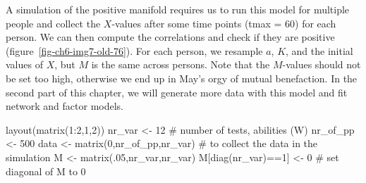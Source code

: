 \documentclass[
  a4paper,
  DIV=11,
  numbers=noendperiod,
  oneside]{scrreprt}
\newenvironment{Shaded}{}{}
\newcommand{\CommentTok}[1]{\textcolor[rgb]{0.42,0.45,0.49}{#1}}
\newcommand{\DecValTok}[1]{\textcolor[rgb]{0.00,0.36,0.77}{#1}}
\newcommand{\FunctionTok}[1]{\textcolor[rgb]{0.44,0.26,0.76}{#1}}
\newcommand{\NormalTok}[1]{\textcolor[rgb]{0.14,0.16,0.18}{#1}}
\newcommand{\OtherTok}[1]{\textcolor[rgb]{0.44,0.26,0.76}{#1}}
\newcommand{\SpecialCharTok}[1]{\textcolor[rgb]{0.00,0.36,0.77}{#1}}
\begin{document}
A simulation of the positive manifold requires us to run this model for
multiple people and collect the \(X\)-values after some time points
(tmax = 60) for each person. We can then compute the correlations and
check if they are positive (figure~\ref{fig-ch6-img7-old-76}). For each
person, we resample \(a\), \(K\), and the initial values of \(X\), but
\(M\) is the same across persons. Note that the \(M\)-values should not
be set too high, otherwise we end up in May's orgy of mutual
benefaction. In the second part of this chapter, we will generate more
data with this model and fit network and factor models.

\begin{Shaded}
\begin{Highlighting}[]
\FunctionTok{layout}\NormalTok{(}\FunctionTok{matrix}\NormalTok{(}\DecValTok{1}\SpecialCharTok{:}\DecValTok{2}\NormalTok{,}\DecValTok{1}\NormalTok{,}\DecValTok{2}\NormalTok{))}
\NormalTok{nr\_var }\OtherTok{\textless{}{-}} \DecValTok{12} \CommentTok{\# number of tests, abilities (W)}
\NormalTok{nr\_of\_pp }\OtherTok{\textless{}{-}} \DecValTok{500}
\NormalTok{data }\OtherTok{\textless{}{-}} \FunctionTok{matrix}\NormalTok{(}\DecValTok{0}\NormalTok{,nr\_of\_pp,nr\_var) }\CommentTok{\# to collect the data in the simulation}
\NormalTok{M }\OtherTok{\textless{}{-}} \FunctionTok{matrix}\NormalTok{(.}\DecValTok{05}\NormalTok{,nr\_var,nr\_var)}
\NormalTok{M[}\FunctionTok{diag}\NormalTok{(nr\_var)}\SpecialCharTok{==}\DecValTok{1}\NormalTok{] }\OtherTok{\textless{}{-}} \DecValTok{0} \CommentTok{\# set diagonal of M to 0}


\end{Highlighting}
\end{Shaded}
\end{document}

